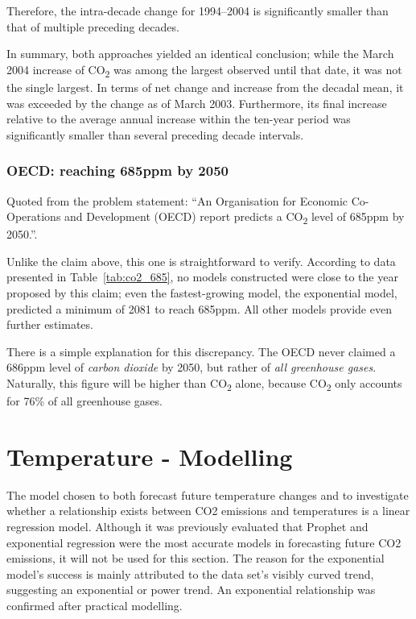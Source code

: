 \documentclass[12pt]{mcmthesis}
\begin{document}
    Therefore, the intra-decade change for 1994--2004 is significantly smaller than that of multiple preceding decades.



    In summary, both approaches yielded an identical conclusion; while the March 2004 increase of CO\textsubscript{2} was among the largest observed until that date, it was not the single largest. In terms of net change and increase from the decadal mean, it was exceeded by the change as of March 2003. Furthermore, its final increase relative to the average annual increase within the ten-year period was significantly smaller than several preceding decade intervals.


    \subsubsection*{OECD: reaching 685ppm by 2050}

   Quoted from the problem statement: ``An Organisation for Economic Co-Operations and Development (OECD) report predicts a CO\textsubscript{2} level of 685ppm by 2050.''.

    Unlike the claim above, this one is straightforward to verify. According to data presented in Table~\ref{tab:co2_685}, no models constructed were close to the year proposed by this claim; even the fastest-growing model, the exponential model, predicted a minimum of 2081 to reach 685ppm.
    All other models provide even further estimates.

    There is a simple explanation for this discrepancy. The OECD never claimed a 686ppm level of \textit{carbon dioxide} by 2050, but rather of \textit{all greenhouse gases}. Naturally, this figure will be higher than CO\textsubscript{2} alone, because CO\textsubscript{2} only accounts for 76\% of all greenhouse gases.


    \section{Temperature - Modelling}

    The model chosen to both forecast future temperature changes and to investigate whether a relationship exists between CO2 emissions and temperatures is a linear regression model. Although it was previously evaluated that Prophet and exponential regression were the most accurate models in forecasting future CO2 emissions, it will not be used for this section. The reason for the exponential model’s success is mainly attributed to the data set’s visibly curved trend, suggesting an exponential or power trend. An exponential relationship was confirmed after practical modelling.
\end{document}
